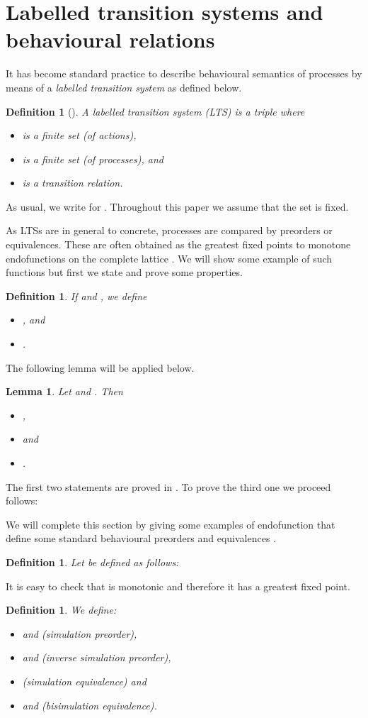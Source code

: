 \documentclass[submission]{eptcs}
\newtheorem{lemma}[theorem]{Lemma}
\newtheorem{definition}[theorem]{Definition}
\newenvironment{proof}[1][Proof]{\begin{trivlist}
\item[\hskip \labelsep {\bfseries #1}]}{\end{trivlist}}
\begin{document}
\section{Labelled transition systems and behavioural relations}\label{sec:LTS}
It has become standard practice to describe behavioural semantics of
processes by means of a \emph{labelled transition system} as defined
below.  
 \begin{definition}[\cite{Ke76}]
   A \emph{labelled transition system (LTS)} is a triple
    where
   \begin{itemize}
   \item  is a finite set (of actions),
  \item  is a finite set (of processes), and
  \item  is a transition relation.
  \end{itemize}
\end{definition}
As usual, we write  for . Throughout
this paper we assume that the set  is fixed.

As LTSs are in general to concrete, processes are compared by
preorders or equivalences. These are often obtained as the greatest
fixed points to monotone endofunctions on the complete lattice
. We will show some example of such functions
but first we state and  prove some properties.
\begin{definition}
  If 
  and , we define
\begin{itemize}
\item
, and 
\item
.
\end{itemize}
\end{definition}
The following lemma  will be applied below.
\begin{lemma} \label{L:inverse} Let  and .  Then 
\begin{itemize}
\item
,
\item
 and
\item .
\end{itemize}
\end{lemma}
\begin{proof}
  The first two statements are proved in \cite{AILS2011}. To prove the third
  one we proceed follows:

\end{proof}
We will complete this section by giving some examples of endofunction that
define some standard behavioural preorders and equivalences
\cite{vG2001,AILS2007}.
\begin{definition}
  Let  be
  defined as follows: 

\end{definition}
It is easy to check that  is monotonic and therefore it has a
greatest fixed point.
\begin{definition}
We define:
\begin{itemize}
\item  and  (simulation
  preorder),
\item  and  (inverse
  simulation preorder),
\item  (simulation equivalence) and
\item  and
   (bisimulation equivalence).
\end{itemize}
\end{definition}
\end{document}
